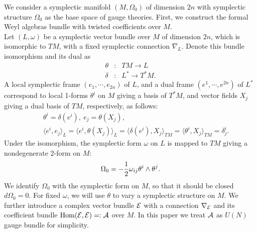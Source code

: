 \documentclass[10pt,a4paper]{article}
\begin{document}
We consider a symplectic manifold $(M,\Omega_0)$ of dimension $2n$ with symplectic structure $\Omega_0$ as the base space of gauge theories. First, we construct the formal Weyl algebras bundle with twisted coefficients over $M$.\\ 
Let $(L,\omega)$ be a symplectic vector bundle over $M$ of dimension $2n$, which is isomorphic to $TM$, with a fixed symplectic connection $\nabla_L$.
Denote this bundle isomorphism and its dual as
\begin{eqnarray}
\theta&:& TM\rightarrow L \nonumber\\
\delta&:& L^*\rightarrow T^*M.
\end{eqnarray}
A local symplectic frame $(e_1,\cdots,e_{2n})$ of $L$, and a dual frame $(e^1,\cdots,e^{2n})$ of $L^*$ correspond to local 1-forms $\theta^i$ on $M$ giving a basis of $T^*M$, and vector fields $X_j$ giving a dual basis of $TM$, respectively, as follows:
\begin{eqnarray}
&&\theta^i=\delta(e^i), \ e_j=\theta(X_j), \nonumber\\
&&\langle e^i,e_j\rangle_L=\langle e^i,\theta(X_j)\rangle_L = \langle\delta(e^i),X_j\rangle_{TM}=\langle\theta^i,X_j\rangle_{TM}=\delta^i_j.
\end{eqnarray}
Under the isomorphism, the symplectic form $\omega$ on $L$ is mapped to $TM$ giving a nondegenerate 2-form on $M$:
\begin{equation}
\Omega_0=-{1\over2}\omega_{ij}\theta^i\wedge\theta^j.
\end{equation}
We identify $\Omega_0$ with the symplectic form on $M$, so that it should be closed $d\Omega_0=0$. For fixed $\omega$, we will use $\theta$ to vary a symplectic structure on $M$.
We further introduce a complex vector bundle ${\cal E}$ with a connection $\nabla_{\cal E}$ and its coefficient bundle ${\rm Hom}({\cal E}, {\cal E})=:{\cal A}$ over $M$. In this paper we treat ${\cal A}$ as $U(N)$ gauge bundle for simplicity.\\
\end{document}
